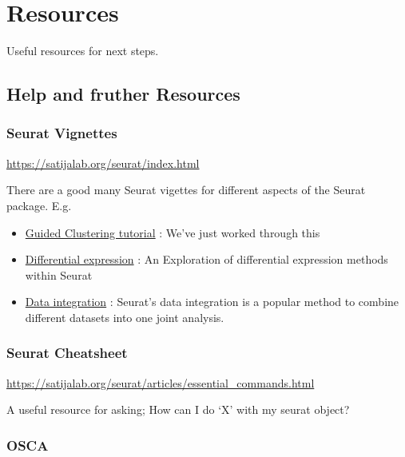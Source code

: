 \documentclass[
]{book}
\providecommand{\tightlist}{%
  \setlength{\itemsep}{0pt}\setlength{\parskip}{0pt}}
\begin{document}
\hypertarget{resources}{%
\chapter{Resources}\label{resources}}

Useful resources for next steps.

\hypertarget{help-and-fruther-resources}{%
\section{Help and fruther Resources}\label{help-and-fruther-resources}}

\hypertarget{seurat-vignettes}{%
\subsection*{Seurat Vignettes}\label{seurat-vignettes}}

\url{https://satijalab.org/seurat/index.html}

There are a good many Seurat vigettes for different aspects of the Seurat package. E.g.

\begin{itemize}
\tightlist
\item
  \href{https://satijalab.org/seurat/articles/pbmc3k_tutorial.html}{Guided Clustering tutorial} : We've just worked through this
\item
  \href{https://satijalab.org/seurat/archive/v3.1/de_vignette.html}{Differential expression} : An Exploration of differential expression methods within Seurat
\item
  \href{https://satijalab.org/seurat/articles/integration_introduction.html}{Data integration} : Seurat's data integration is a popular method to combine different datasets into one joint analysis.
\end{itemize}

\hypertarget{seurat-cheatsheet}{%
\subsection*{Seurat Cheatsheet}\label{seurat-cheatsheet}}

\url{https://satijalab.org/seurat/articles/essential_commands.html}

A useful resource for asking; How can I do `X' with my seurat object?

\hypertarget{osca}{%
\subsection*{OSCA}\label{osca}}
\end{document}
